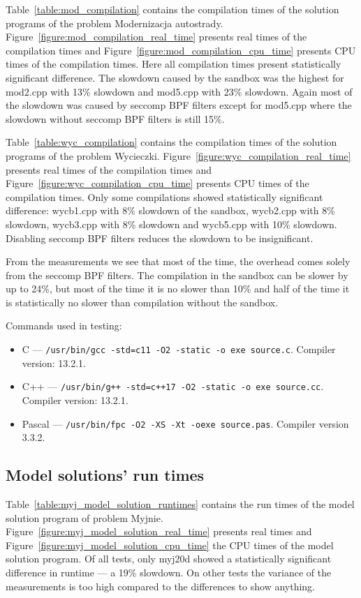 \documentclass[en]{pracamgr}
\begin{document}
Table~\ref{table:mod_compilation} contains the compilation times of the solution programs of the problem Modernizacja autostrady. Figure~\ref{figure:mod_compilation_real_time} presents real times of the compilation times and Figure~\ref{figure:mod_compilation_cpu_time} presents CPU times of the compilation times. Here all compilation times present statistically significant difference. The slowdown caused by the sandbox was the highest for mod2.cpp with 13\% slowdown and mod5.cpp with 23\% slowdown. Again most of the slowdown was caused by seccomp BPF filters except for mod5.cpp where the slowdown without seccomp BPF filters is still 15\%.

Table~\ref{table:wyc_compilation} contains the compilation times of the solution programs of the problem Wycieczki. Figure~\ref{figure:wyc_compilation_real_time} presents real times of the compilation times and Figure~\ref{figure:wyc_compilation_cpu_time} presents CPU times of the compilation times. Only some compilations showed statistically significant difference: wycb1.cpp with 8\% slowdown of the sandbox, wycb2.cpp with 8\% slowdown, wycb3.cpp with 8\% slowdown and wycb5.cpp with 10\% slowdown. Disabling seccomp BPF filters reduces the slowdown to be insignificant.

From the measurements we see that most of the time, the overhead comes solely from the seccomp BPF filters. The compilation in the sandbox can be slower by up to 24\%, but most of the time it is no slower than 10\% and half of the time it is statistically no slower than compilation without the sandbox.

Commands used in testing:
\begin{itemize}
    \item C --- \texttt{/usr/bin/gcc -std=c11 -O2 -static -o exe source.c}. Compiler version: 13.2.1.
    \item C++ --- \texttt{/usr/bin/g++ -std=c++17 -O2 -static -o exe source.cc}. Compiler version: 13.2.1.
    \item Pascal --- \texttt{/usr/bin/fpc -O2 -XS -Xt -oexe source.pas}. Compiler version 3.3.2.
\end{itemize}

\subsection{Model solutions' run times}

Table~\ref{table:myj_model_solution_runtimes} contains the run times of the model solution program of problem Myjnie. Figure~\ref{figure:myj_model_solution_real_time} presents real times and Figure~\ref{figure:myj_model_solution_cpu_time} the CPU times of the model solution program. Of all tests, only myj20d showed a statistically significant difference in runtime --- a 19\% slowdown. On other tests the variance of the measurements is too high compared to the differences to show anything.
\end{document}
